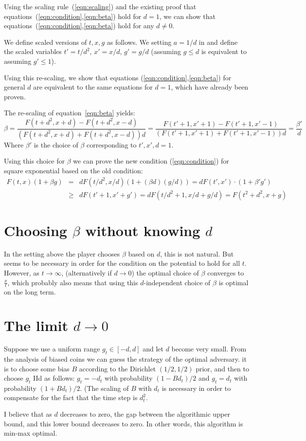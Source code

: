 \documentclass{article}
\begin{document}
Using the scaling rule~(\ref{eqn:scaling}) and the existing proof that  equations~(\ref{eqn:condition},\ref{eqn:beta}) hold for $d=1$, we can show that equations~(\ref{eqn:condition},\ref{eqn:beta}) hold for any $d \neq 0$. 

We define scaled versions of $t,x,g$ as follows. We setting $a=1/d$ in \label{eqn:scaling}  and define the scaled variables $t'=t/d^2$, $x'=x/d$, $g' = g/d$ (assuming $g \leq d$ is equivalent to assuming $g' \leq 1$).

Using this re-scaling, we show that equations (\ref{eqn:condition},\ref{eqn:beta}) for general $d$ are equivalent to the same equations for $d=1$, which have already been proven.

The re-scaling of equation~\ref{eqn:beta} yields:
\[
\beta 
= \frac{F(t+d^2,x+d)-F(t+d^2,x-d)}{(F(t+d^2,x+d)+F(t+d^2,x-d))d}
= \frac{F(t'+1,x'+1)-F(t'+1,x'-1)}{(F(t'+1,x'+1)+F(t'+1,x'-1))d} = \frac{\beta'}{d}
\]
Where $\beta'$ is the choice of $\beta$ corresponding to $t',x',d=1$.

Using this choice for $\beta$ we can prove the new condition (\ref{eqn:condition}) for square exponential based on the old condition:
\begin{eqnarray*}
F(t,x) (1+\beta g) &=& dF(t / d^2,x/ d) (1+(\beta d)(g/d)) = 
d F(t',x')\cdot(1 + \beta' g') \\
&\geq & d F(t'+1,x'+g') = d F(t/d^2 + 1, x/d +g/d)
= F(t^2 + d^2,x + g)
\end{eqnarray*}


\section{Choosing $\beta$ without knowing $d$}

In the setting above the player chooses $\beta$ based on $d$, this is not natural. But seems to be necessary in order for the condition on the potential to hold for all $t$. However, as $t \to \infty$, (alternatively if $d \to 0$) the optimal choice of $\beta$ converges to $\frac{x}{t}$, which probably also means that using this $d$-independent choice of $\beta$ is optimal on the long term.

\section{The limit $d \to 0$}

Suppose we use a uniform range $g_t \in [-d,d]$ and let $d$ become very small.
From the analysis of biased coins we can guess the strategy of the optimal adversary. it is to choose some bias $B$ according to the Dirichlet $(1/2,1/2)$ prior, and then to choose $g_t$ IId as follows:
$g_t = -d_t$ with probability $(1-B d_t)/2$ and $g_t=d_t$ with probability $(1+B d_t)/2$. (The scaling of $B$ with $d_t$ is necessary in order to compensate for the fact that the time step is $d_t^2$. 

I believe that as $d$ decreases to zero, the gap between the algorithmic upper bound, and this lower bound decreases to zero. In other words, this algorithm is min-max optimal.
\end{document}
